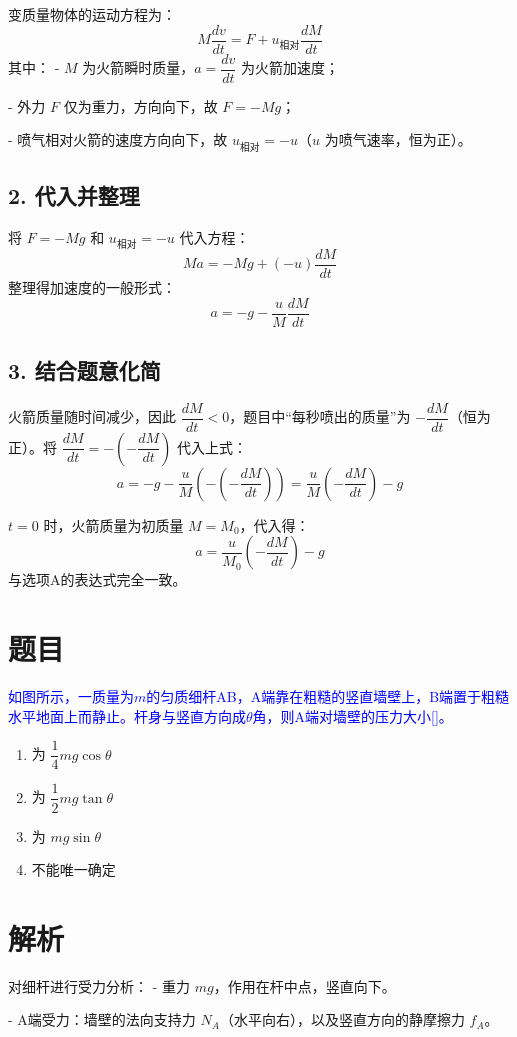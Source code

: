 \documentclass[11pt,a4paper]{article}
\begin{document}
变质量物体的运动方程为：
\[
M \frac{dv}{dt} = F + u_{\text{相对}} \frac{dM}{dt}
\]
其中：
- $M$ 为火箭瞬时质量，$a = \dfrac{dv}{dt}$ 为火箭加速度；

- 外力 $F$ 仅为重力，方向向下，故 $F = -Mg$；

- 喷气相对火箭的速度方向向下，故 $u_{\text{相对}} = -u$（$u$ 为喷气速率，恒为正）。

\subsection*{2. 代入并整理}
将 $F = -Mg$ 和 $u_{\text{相对}} = -u$ 代入方程：
\[
M a = -Mg + (-u) \frac{dM}{dt}
\]
整理得加速度的一般形式：
\[
a = -g - \frac{u}{M} \frac{dM}{dt}
\]

\subsection*{3. 结合题意化简}
火箭质量随时间减少，因此 $\dfrac{dM}{dt} < 0$，题目中“每秒喷出的质量”为 $-\dfrac{dM}{dt}$（恒为正）。将 $\dfrac{dM}{dt} = -\left(-\dfrac{dM}{dt}\right)$ 代入上式：
\[
a = -g - \frac{u}{M} \left( -\left(-\frac{dM}{dt}\right) \right) = \frac{u}{M} \left( -\frac{dM}{dt} \right) - g
\]

$t=0$ 时，火箭质量为初质量 $M = M_0$，代入得：
\[
a = \frac{u}{M_0} \left( -\frac{dM}{dt} \right) - g
\]
与选项A的表达式完全一致。

\section*{题目}
\textcolor{blue}{如图所示，一质量为$m$的匀质细杆AB，A端靠在粗糙的竖直墙壁上，B端置于粗糙水平地面上而静止。杆身与竖直方向成$\theta$角，则A端对墙壁的压力大小[]。}
\begin{enumerate}
    \item[A] 为 $\dfrac{1}{4}mg\cos\theta$
    \item[B] 为 $\dfrac{1}{2}mg\tan\theta$
    \item[C] 为 $mg\sin\theta$
    \item[D] 不能唯一确定
\end{enumerate}

\section*{解析}

对细杆进行受力分析：
- 重力 $mg$，作用在杆中点，竖直向下。

- A端受力：墙壁的法向支持力 $N_A$（水平向右），以及竖直方向的静摩擦力 $f_A$。
\end{document}

